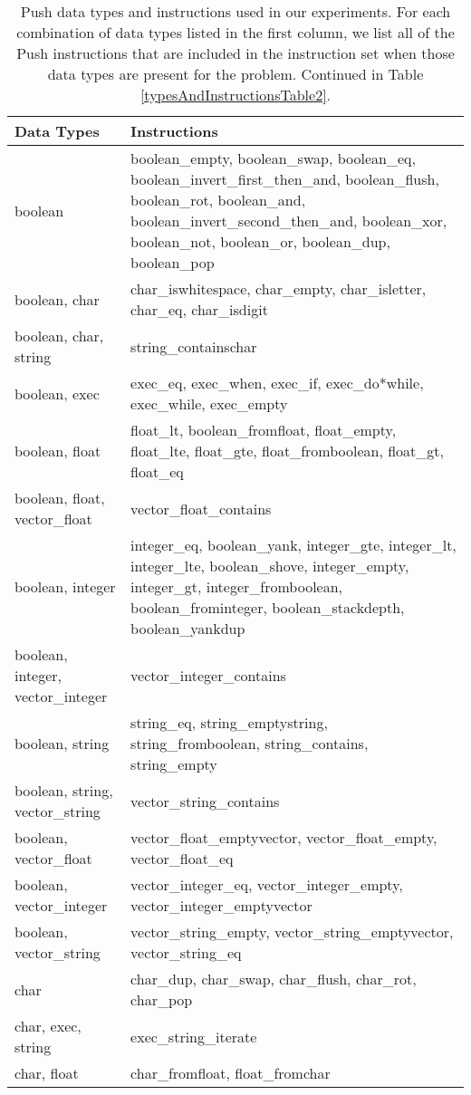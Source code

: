 \documentclass{sig-alternate}
\begin{document}
\begin{table*}
\centering
\caption{Push data types and instructions used in our experiments. For each combination of data types listed in the first column, we list all of the Push instructions that are included in the instruction set when those data types are present for the problem. Continued in Table \ref{typesAndInstructionsTable2}.}
\label{typesAndInstructionsTable}
\begin{tabular}{>{\raggedright}p{4cm} >{\raggedright}p{13cm}}
\toprule
\textbf{Data Types} & \textbf{Instructions} \tabularnewline
\midrule
boolean & boolean\_empty, boolean\_swap, boolean\_eq, boolean\_invert\_first\_then\_and, boolean\_flush, boolean\_rot, boolean\_and, boolean\_invert\_second\_then\_and, boolean\_xor, boolean\_not, boolean\_or, boolean\_dup, boolean\_pop \tabularnewline
boolean, char & char\_iswhitespace, char\_empty, char\_isletter, char\_eq, char\_isdigit \tabularnewline
boolean, char, string & string\_containschar \tabularnewline
boolean, exec & exec\_eq, exec\_when, exec\_if, exec\_do*while, exec\_while, exec\_empty \tabularnewline
boolean, float & float\_lt, boolean\_fromfloat, float\_empty, float\_lte, float\_gte, float\_fromboolean, float\_gt, float\_eq \tabularnewline
boolean, float, vector\_float & vector\_float\_contains \tabularnewline
boolean, integer & integer\_eq, boolean\_yank, integer\_gte, integer\_lt, integer\_lte, boolean\_shove, integer\_empty, integer\_gt, integer\_fromboolean, boolean\_frominteger, boolean\_stackdepth, boolean\_yankdup \tabularnewline
boolean, integer, vector\_integer & vector\_integer\_contains \tabularnewline
boolean, string & string\_eq, string\_emptystring, string\_fromboolean, string\_contains, string\_empty \tabularnewline
boolean, string, vector\_string & vector\_string\_contains \tabularnewline
boolean, vector\_float & vector\_float\_emptyvector, vector\_float\_empty, vector\_float\_eq \tabularnewline
boolean, vector\_integer & vector\_integer\_eq, vector\_integer\_empty, vector\_integer\_emptyvector \tabularnewline
boolean, vector\_string & vector\_string\_empty, vector\_string\_emptyvector, vector\_string\_eq \tabularnewline
char & char\_dup, char\_swap, char\_flush, char\_rot, char\_pop \tabularnewline
char, exec, string & exec\_string\_iterate \tabularnewline
char, float & char\_fromfloat, float\_fromchar \tabularnewline

\end{tabular}
\end{table*}
\end{document}
